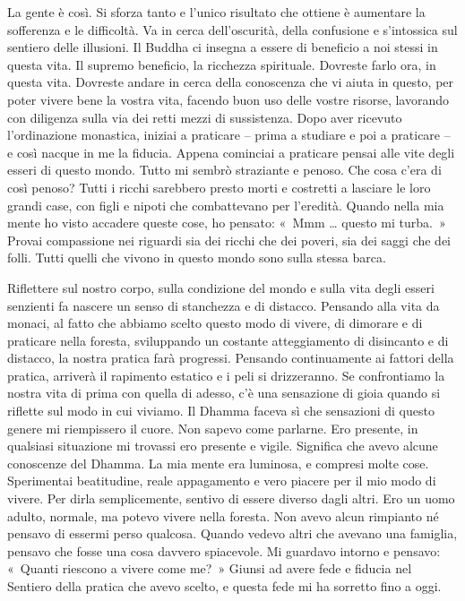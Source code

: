 La gente è così. Si sforza tanto e l'unico risultato che ottiene è
aumentare la sofferenza e le difficoltà. Va in cerca dell'oscurità,
della confusione e s'intossica sul sentiero delle illusioni. Il Buddha
ci insegna a essere di beneficio a noi stessi in questa vita. Il supremo
beneficio, la ricchezza spirituale. Dovreste farlo ora, in questa vita.
Dovreste andare in cerca della conoscenza che vi aiuta in questo, per
poter vivere bene la vostra vita, facendo buon uso delle vostre risorse,
lavorando con diligenza sulla via dei retti mezzi di sussistenza. Dopo
aver ricevuto l'ordinazione monastica, iniziai a praticare -- prima a
studiare e poi a praticare -- e così nacque in me la fiducia. Appena
cominciai a praticare pensai alle vite degli esseri di questo mondo.
Tutto mi sembrò straziante e penoso. Che cosa c'era di così penoso?
Tutti i ricchi sarebbero presto morti e costretti a lasciare le loro
grandi case, con figli e nipoti che combattevano per l'eredità. Quando
nella mia mente ho visto accadere queste cose, ho pensato: «~Mmm \ldots{}
questo mi turba.~» Provai compassione nei riguardi sia dei ricchi che
dei poveri, sia dei saggi che dei folli. Tutti quelli che vivono in
questo mondo sono sulla stessa barca.

Riflettere sul nostro corpo, sulla condizione del mondo e sulla vita
degli esseri senzienti fa nascere un senso di stanchezza e di distacco.
Pensando alla vita da monaci, al fatto che abbiamo scelto questo modo di
vivere, di dimorare e di praticare nella foresta, sviluppando un
costante atteggiamento di disincanto e di distacco, la nostra pratica
farà progressi. Pensando continuamente ai fattori della pratica,
arriverà il rapimento estatico e i peli si drizzeranno. Se confrontiamo
la nostra vita di prima con quella di adesso, c'è una sensazione di
gioia quando si riflette sul modo in cui viviamo. Il Dhamma faceva sì
che sensazioni di questo genere mi riempissero il cuore. Non sapevo come
parlarne. Ero presente, in qualsiasi situazione mi trovassi ero presente
e vigile. Significa che avevo alcune conoscenze del Dhamma. La mia mente
era luminosa, e compresi molte cose. Sperimentai beatitudine, reale
appagamento e vero piacere per il mio modo di vivere. Per dirla
semplicemente, sentivo di essere diverso dagli altri. Ero un uomo
adulto, normale, ma potevo vivere nella foresta. Non avevo alcun
rimpianto né pensavo di essermi perso qualcosa. Quando vedevo altri che
avevano una famiglia, pensavo che fosse una cosa davvero spiacevole. Mi
guardavo intorno e pensavo: «~Quanti riescono a vivere come me?~» Giunsi
ad avere fede e fiducia nel Sentiero della pratica che avevo scelto, e
questa fede mi ha sorretto fino a oggi.

